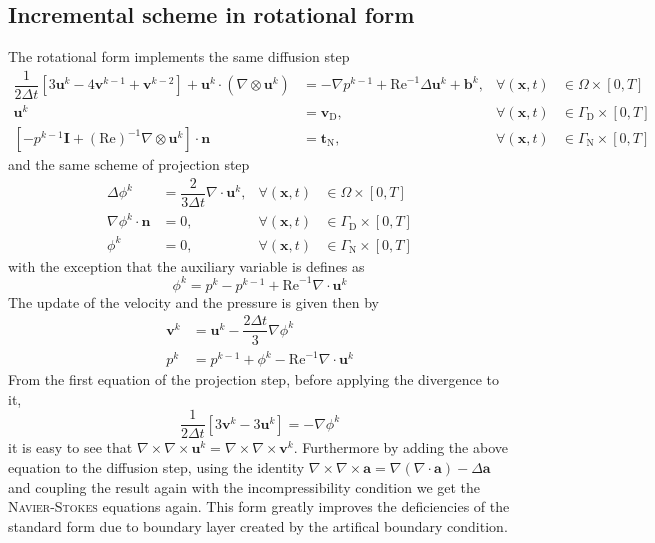 \documentclass[]{scrartcl}
\newcommand{\bs}[1]{\boldsymbol{#1}}
\begin{document}
\subsection{Incremental scheme in rotational form}
The rotational form implements the same diffusion step
\begin{equation*}
	\begin{aligned}
		\dfrac{1}{2\Delta t} \left[3\bs{u}^{k} - 4\bs{v}^{k-1} + \bs{v}^{k-2}\right]  + \bs{u}^{k} \cdot (\nabla \otimes \bs{u}^{k}) &= -\nabla p^{k-1} +  \mathrm{Re}^{-1} \Delta \bs{u}^{k} + \bs{b}^{k}, &\forall (\bs{x}, t) &\in \Omega \times \left[0, T \right]  \\
		\bs{u}^{k} &= \bs{v}_\textrm{D}, &\forall (\bs{x}, t) &\in \Gamma_\textrm{D} \times \left[0, T \right] \\
		[-p^{k-1} \bs{I} + (\textrm{Re})^{-1}\nabla \otimes \bs{u}^{k}]\cdot \bs{n} &= \bs{t}_\textrm{N}, &\forall \left(\bs{x}, t\right) &\in \Gamma_\textrm{N} \times \left[0, T \right]
	\end{aligned}
\end{equation*}
and the same scheme of projection step
\begin{equation*}
	\begin{aligned}
		\Delta \phi^{k} &= \dfrac{2}{3\Delta t} \nabla \cdot \bs{u}^{k},  &\forall (\bs{x}, t) &\in \Omega \times \left[0, T \right] \\
		\nabla \phi^{k} \cdot \bs{n} &= 0, &\forall (\bs{x}, t) &\in \Gamma_\textrm{D} \times \left[0, T \right] \\
		\phi^{k} &= 0, &\forall\left(\bs{x}, t\right) &\in \Gamma_\textrm{N} \times \left[0, T \right]
	\end{aligned}
\end{equation*}
with the exception that the auxiliary variable is defines as
\begin{equation*}
	\phi^{k} = p^{k} - p^{k-1} + \textrm{Re}^{-1} \nabla \cdot \bs{u}^{k}
\end{equation*}
The update of the velocity and the pressure is given then by
\begin{equation*}
	\begin{aligned}
		\bs{v}^{k} &= \bs{u}^{k} - \dfrac{2\Delta t}{3} \nabla \phi^{k} \\
		p^{k} &= p^{k-1} + \phi^{k} -  \textrm{Re}^{-1} \nabla \cdot \bs{u}^{k}
	\end{aligned}
\end{equation*}
 From the first equation of the projection step, before applying the divergence to it, 
\begin{equation*}
\dfrac{1}{2\Delta t} \left[3\bs{v}^{k} - 3\bs{u}^{k} \right] = -\nabla \phi^{k}
\end{equation*}
it is easy to see that $\nabla \times \nabla \times \bs{u}^k = \nabla \times \nabla \times \bs{v}^k$. Furthermore by adding the above equation to the diffusion step, using the identity $\nabla \times \nabla \times \bs{a} = \nabla (\nabla \cdot \bs{a}) - \Delta \bs{a}$ and coupling the result again with the incompressibility condition we get the \textsc{Navier-Stokes} equations again. This form greatly improves the deficiencies of the standard form due to boundary layer created by the artifical boundary condition. 
\end{document}

